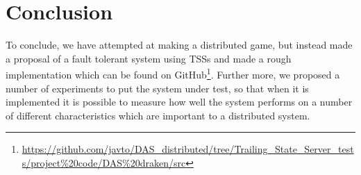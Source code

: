 \section{Conclusion}
\label{chap:con}
To conclude, we have attempted at making a distributed game, but instead made a proposal of a fault tolerant system using TSSs and made a rough implementation which can be found on GitHub\footnote{\url{https://github.com/javto/DAS\_distributed/tree/Trailing\_State\_Server\_tests/project\%20code/DAS\%20draken/src}}.
Further more, we proposed a number of experiments to put the system under test, so that when it is implemented it is possible to measure how well the system performs on a number of different characteristics which are important to a distributed system.
		
		
	